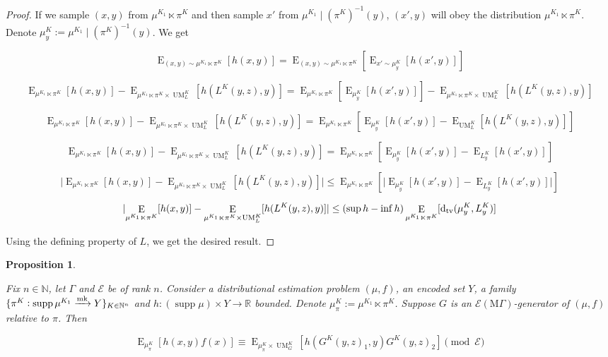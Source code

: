 \documentclass{article}
\numberwithin{equation}{section}
\theoremstyle{definition}
\theoremstyle{plain}
\newtheorem{proposition}{Proposition}[section]
\DeclareMathOperator{\Supp}{supp}
\DeclareMathOperator{\E}{E}
\DeclareMathOperator{\UM}{UM}
\newcommand{\Dtv}{\operatorname{d}_{\textnormal{tv}}}
\newcommand{\Nats}{\mathbb{N}}
\newcommand{\Reals}{\mathbb{R}}
\newcommand{\Abs}[1]{\lvert #1 \rvert}
\newcommand{\MGrow}{\mathrm{M}\Gamma}
\newcommand{\Fall}{\mathcal{E}}
\newcommand{\Markov}{\xrightarrow{\textnormal{mk}}}
\begin{document}
\begin{proof}

If we sample $(x,y)$ from $\mu^{K_1} \ltimes \pi^K$ and then sample $x'$ from ${\mu^{K_1} \mid (\pi^K)^{-1}(y)}$, $(x',y)$ will obey the distribution $\mu^{K_1} \ltimes \pi^K$. Denote $\mu_y^K:=\mu^{K_1} \mid (\pi^K)^{-1}(y)$. We get

$$\E_{(x,y) \sim \mu^{K_1} \ltimes \pi^K}[h(x,y)] = \E_{(x,y) \sim \mu^{K_1} \ltimes \pi^K}[\E_{x' \sim \mu_y^K}[h(x',y)]]$$

$$\E_{\mu^{K_1} \ltimes \pi^K}[h(x,y)] - \E_{\mu^{K_1} \ltimes \pi^K \times \UM_L^K}[h(L^K(y,z),y)] = \E_{\mu^{K_1} \ltimes \pi^K}[\E_{\mu_y^K}[h(x',y)]] - \E_{\mu^{K_1} \ltimes \pi^K \times \UM_L^K}[h(L^K(y,z),y)]$$

$$\E_{\mu^{K_1} \ltimes \pi^K}[h(x,y)] - \E_{\mu^{K_1} \ltimes \pi^K \times \UM_L^K}[h(L^K(y,z),y)] = \E_{\mu^{K_1} \ltimes \pi^K}[\E_{\mu_y^K}[h(x',y)]-\E_{\UM_L^K}[h(L^K(y,z),y)]]$$

$$\E_{\mu^{K_1} \ltimes \pi^K}[h(x,y)] - \E_{\mu^{K_1} \ltimes \pi^K \times \UM_L^K}[h(L^K(y,z),y)] = \E_{\mu^{K_1} \ltimes \pi^K}[\E_{\mu_y^K}[h(x',y)]-\E_{L_y^K}[h(x',y)]]$$

$$\Abs{\E_{\mu^{K_1} \ltimes \pi^K}[h(x,y)] - \E_{\mu^{K_1} \ltimes \pi^K \times \UM_L^K}[h(L^K(y,z),y)]} \leq \E_{\mu^{K_1} \ltimes \pi^K}[\Abs{\E_{\mu_y^K}[h(x',y)]-\E_{L_y^K}[h(x',y)]}]$$

$$\Abs{\E_{\mu^{K_1} \ltimes \pi^K}[h(x,y)] - \E_{\mu^{K_1} \ltimes \pi^K \times \UM_L^K}[h(L^K(y,z),y)]} \leq (\sup h - \inf h) \E_{\mu^{K_1} \ltimes \pi^K}[\Dtv(\mu_y^K,L_y^K)]$$

Using the defining property of $L$, we get the desired result.

\end{proof}

\begin{proposition}
\label{prp:gen}

Fix $n \in \Nats$, let $\Gamma$ and $\Fall$ be of rank $n$. Consider a distributional estimation problem $(\mu,f)$, an encoded set $Y$, a family ${\{\pi^K: \Supp \mu^{K_1} \Markov Y\}_{K \in \Nats^n}}$ and ${h: (\Supp \mu) \times Y \rightarrow \Reals}$ bounded. Denote $\mu_\pi^K:=\mu^{K_1} \ltimes \pi^K$. Suppose $G$ is an $\Fall(\MGrow)$-generator of $(\mu,f)$ relative to $\pi$. Then

\begin{equation}
\E_{\mu_\pi^K}[h(x,y)f(x)] \equiv \E_{\mu_\pi^K \times \UM_G^K}[h(G^K(y,z)_1,y)G^K(y,z)_2] \pmod \Fall
\end{equation}

\end{proposition}
\end{document}
